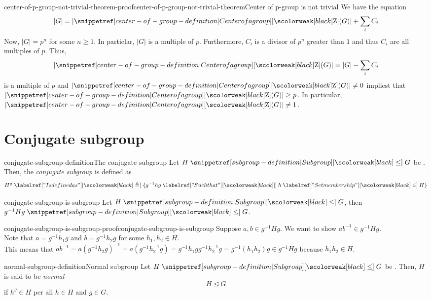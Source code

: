 \documentclass[preview]{standalone}
\begin{document}
\begin{snippetproof}{center-of-p-group-not-trivial-theorem-proof}{center-of-p-group-not-trivial-theorem}{Center of p-group is not trivial}
    We have the equation
    \[
        |G| = |\groupcenter(G)| + \sum_i C_i
    \]
    Now, \(|G| = p^n\) for some \(n \geq 1\).
    In particlar, \(|G|\) is a multiple of \(p\).
    Furthermore, \(C_i\) is a divisor of \(p^n\) greater than \(1\)
    and thus \(C_i\) are all multiples of \(p\).
    Thus,
    \[
        |\groupcenter(G)| = |G| - \sum_i C_i
    \]
    is a multiple of \(p\) and \(|\groupcenter(G)| \neq 0\) impliest that \(|\groupcenter(G)| \geq p\).
    In particular, \(|\groupcenter(G)| \neq 1\). 
\end{snippetproof}

\section{Conjugate subgroup}

\begin{snippetdefinition}{conjugate-subgroup-definition}{The conjugate subgroup}
    Let \(H \subgroupleq G\) be \group[groups]. Then, the \textit{conjugate subgroup} is defined as
    \[
        H^g \triangleq \{
            g^{-1}hg \suchthat h \in H
        \}
    \]
\end{snippetdefinition}

\begin{snippettheorem}{conjugate-subgroup-is-subgroup}{}
    Let \(H \subgroupleq G\), then \(g^{-1}Hg \subgroupleq G\).
\end{snippettheorem}

\begin{snippetproof}{conjugate-subgroup-is-subgroup-proof}{conjugate-subgroup-is-subgroup}{}
    Suppose \(a,b \in g^{-1}Hg\).
    We want to show \(ab^{-1} \in g^{-1}Hg\).\\
    Note that \(a = g^{-1}h_1g\) and \(b = g^{-1}h_2g\)
    for some \(h_1, h_2 \in H\). \\
    This means that \(ab^{-1}=a{(g^{-1}h_2g)}^{-1} = a(g^{-1}h_2^{-1}g)
    =g^{-1}h_1gg^{-1}h_2^{-1}g = g^{-1} (h_1h_2) g \in g^{-1}Hg \)
    because \(h_1h_2 \in H\).
\end{snippetproof}

\begin{snippetdefinition}{normal-subgroup-definition}{Normal subgroup}
    Let \(H \subgroupleq G\) be \group[groups]. Then, \(H\)
    is said to be \emph{normal}
    \[
        H \unlhd G
    \]
    if \(h^g \in H\) per all \(h\in H\) and \(g\in G\).
\end{snippetdefinition}
\end{document}
